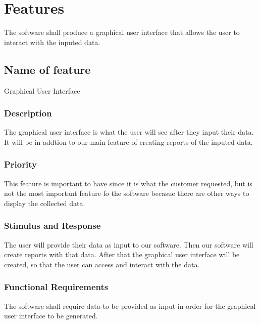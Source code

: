 \section{Features}

The software shall produce a graphical user interface that allows the user to interact with the inputed data.

\subsection{Name of feature}

Graphical User Interface

\subsubsection{Description}

The graphical user interface is what the user will see after they input their data. It will be in addtion to our main feature of creating reports of the inputed data.

\subsubsection{Priority}

This feature is important to have since it is what the customer requested, but is not the most important feature fo the software becasue there are other ways to display the collected data.

\subsubsection{Stimulus and Response}

The user will provide their data as input to our software. Then our software will create reports with that data. After that the graphical user interface will be created, so that the user can access and interact with the data. 

\subsubsection{Functional Requirements}

The software shall require data to be provided as input in order for the graphical user interface to be generated.
